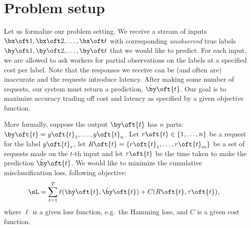 \section{Problem setup}
\label{sec:model}


Let us formalize our problem setting. %
We receive a stream of inputs $\bx\oft1, \bx\oft2, \ldots, \bx\oft t$ with corresponding {\em unobserved\/} true labels $\by\oft1, \by\oft2, \ldots, \by\oft t$ that we would like to predict.
For each input, we are allowed to ask workers for partial observations on the labels at a specified cost per label.
Note that the responses we receive can be (and often are) inaccurate and the requests introduce latency.
After making some number of requests, our system must return a prediction, $\byt\oft{t}$.
Our goal is to maximize accuracy trading off cost and latency as specified by a given objective function.

More formally, suppose the output $\by\oft{t}$ has $n$ parts: $\by\oft{t} = y\oft{t}_1, \dots, y\oft{t}_n$.
Let $r\oft{t} \in \{1, \ldots, n\}$ be a request for the label $y\oft{t}_r$,
let $R\oft{t} = \{r\oft{t}_1, \dots, r\oft{t}_m\}$ be a set of requests made on the $t$-th input and
let $\tau\oft{t}$ be the time taken to make the prediction $\byt\oft{t}$. 
We would like to minimize the cumulative misclassification loss, 
following objective:
\begin{align*}
  \sL &= \sum_{t=1}^T \ell(\by\oft{t}, \byt\oft{t}) + C(R\oft{t}, \tau\oft{t}),
\end{align*}
where $\ell$ is a given loss function, e.g.\ the Hamming loss, and $C$ is a given cost function.



